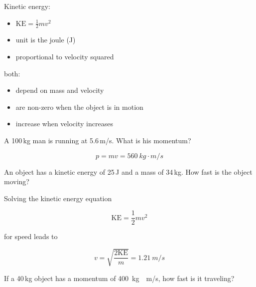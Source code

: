 \documentclass[../main-physics-problems.tex]{subfiles}
\begin{document}
\begin{questions}
\begin{solution}
\bigskip

Kinetic energy:

\begin{itemize}[itemsep=0pt,topsep=0pt]
    \item $\mathrm{KE} = \frac{1}{2} mv^2$
    \item unit is the joule (J) 
    \item proportional to velocity squared
\end{itemize}

\bigskip

both:

\begin{itemize}[itemsep=0pt,topsep=0pt]
    \item depend on mass and velocity
    \item are non-zero when the object is in motion
    \item increase when velocity increases
\end{itemize}
\end{solution}



\question %
A 100\,kg man is running at 5.6\,m/s. What is his momentum? 

\begin{solution}
\phantom{.}

\begin{equation*}
    p = mv = \boxed{\SI{560}{kg\cdot m/s}}
\end{equation*}
\end{solution}



\question %
An object has a kinetic energy of 25\,J and a mass of 34\,kg. How fast is the object moving? 

\begin{solution}
Solving the kinetic energy equation

\begin{equation*}
    \mathrm{KE} = \frac{1}{2} mv^2
\end{equation*}

for speed leads to

\begin{equation*}
    v = \sqrt{\frac{2\mathrm{KE}}{m}} = \boxed{\SI{1.21}{m/s}}
\end{equation*}
\end{solution}

\question %
If a 40\,kg object has a momentum of \SI{400}{kg\cdot m/s}, how fast is it traveling?


\end{questions}
\end{document}
